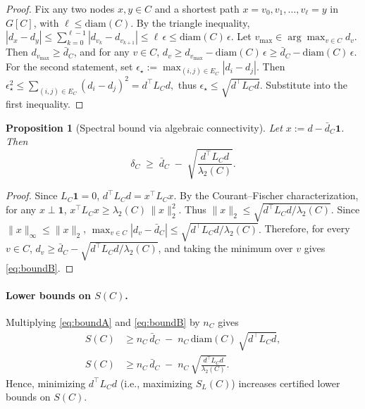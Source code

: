 \documentclass{article} %
\newtheorem{proposition}{Proposition}
\theoremstyle{remark}
\newcommand{\diam}{\mathrm{diam}}
\begin{document}
\begin{proof}
Fix any two nodes \(x,y\in C\) and a shortest path \(x=v_0,v_1,\dots,v_\ell=y\) in \(G[C]\), with \(\ell\le \diam(C)\).
By the triangle inequality,
\(
|d_x-d_y|
\le
\sum_{k=0}^{\ell-1}|d_{v_k}-d_{v_{k+1}}|
\le
\ell\,\epsilon
\le
\diam(C)\,\epsilon.
\)
Let \(v_{\max}\in\arg\max_{v\in C} d_v\). Then \(d_{v_{\max}}\ge \bar d_C\), and for any \(v\in C\),
\(
d_v \ge d_{v_{\max}}-\diam(C)\,\epsilon \ge \bar d_C-\diam(C)\,\epsilon.
\)
For the second statement, set
\(\epsilon_\star:=\max_{(i,j)\in E_C}|d_i-d_j|\).
Then
\(
\epsilon_\star^2 \le \sum_{(i,j)\in E_C}(d_i-d_j)^2 = d^\top L_C d,
\)
thus \(\epsilon_\star \le \sqrt{d^\top L_C d}\). Substitute into the first inequality.
\end{proof}

\begin{proposition}[Spectral bound via algebraic connectivity]
\label{prop:lambda2_bound}
Let \(x := d - \bar d_C \mathbf{1}\). Then
\begin{equation}
\label{eq:boundB}
\delta_C \;\ge\; \bar d_C \;-\; \sqrt{\frac{d^\top L_C d}{\lambda_2(C)}}.
\end{equation}
\end{proposition}

\begin{proof}
Since \(L_C\mathbf{1}=0\),
\(
d^\top L_C d = x^\top L_C x.
\)
By the Courant--Fischer characterization, for any \(x\perp \mathbf{1}\),
\(
x^\top L_C x \ge \lambda_2(C)\,\|x\|_2^2.
\)
Thus
\(
\|x\|_2 \le \sqrt{d^\top L_C d / \lambda_2(C)}.
\)
Since \(\|x\|_\infty \le \|x\|_2\),
\(
\max_{v\in C}|d_v-\bar d_C|
\le
\sqrt{d^\top L_C d / \lambda_2(C)}.
\)
Therefore, for every \(v\in C\),
\(
d_v \ge \bar d_C - \sqrt{d^\top L_C d / \lambda_2(C)}\),
and taking the minimum over \(v\) gives \eqref{eq:boundB}.
\end{proof}

\paragraph{Lower bounds on \boldmath$S(C)$.}
Multiplying \eqref{eq:boundA} and \eqref{eq:boundB} by \(n_C\) gives
\begin{align}
S(C) &\ge n_C\,\bar d_C \;-\; n_C\,\diam(C)\,\sqrt{d^\top L_C d},
\label{eq:S_lowerA}\\
S(C) &\ge n_C\,\bar d_C \;-\; n_C\,\sqrt{\frac{d^\top L_C d}{\lambda_2(C)}}.
\label{eq:S_lowerB}
\end{align}
Hence, minimizing \(d^\top L_C d\) (i.e., maximizing \(S_L(C)\)) increases certified lower bounds on \(S(C)\).
\end{document}
